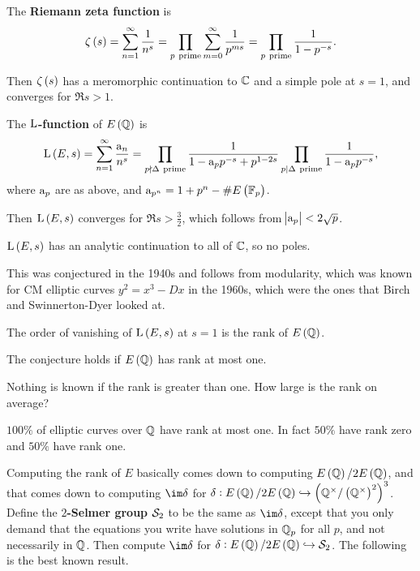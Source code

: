 \begin{definition}
The \textbf{Riemann zeta function} is
$$ \zeta\br{s} = \sum_{n = 1}^\infty \dfrac{1}{n^s} = \prod_{p \ \text{prime}} \sum_{m = 0}^\infty \dfrac{1}{p^{ms}} = \prod_{p \ \text{prime}} \dfrac{1}{1 - p^{-s}}. $$
\end{definition}

Then $ \zeta\br{s} $ has a meromorphic continuation to $ \mathbb{C} $ and a simple pole at $ s = 1 $, and converges for $ \Re s > 1 $.

\begin{definition}
The \textbf{$ \mathrm{L} $-function} of $ E\br{\QQ} $ is
$$ \L\br{E, s} = \sum_{n = 1}^\infty \dfrac{\a_n}{n^s} = \prod_{p \nmid \Delta \ \text{prime}} \dfrac{1}{1 - \a_pp^{-s} + p^{1 - 2s}}\prod_{p \mid \Delta \ \text{prime}} \dfrac{1}{1 - \a_pp^{-s}}, $$
where $ \mathrm{a}_p $ are as above, and $ \a_{p^n} = 1 + p^n - \#E\br{\FF_p} $.
\end{definition}

Then $ \L\br{E, s} $ converges for $ \Re s > \tfrac{3}{2} $, which follows from $ \abs{\mathrm{a}_p} < 2\sqrt{p} $.

\begin{theorem}
$ \L\br{E, s} $ has an analytic continuation to all of $ \mathbb{C} $, so no poles.
\end{theorem}

This was conjectured in the 1940s and follows from modularity, which was known for CM elliptic curves $ y^2 = x^3 - Dx $ in the 1960s, which were the ones that Birch and Swinnerton-Dyer looked at.

\begin{conjecture}
The order of vanishing of $ \L\br{E, s} $ at $ s = 1 $ is the rank of $ E\br{\QQ} $.
\end{conjecture}

\begin{theorem}
The conjecture holds if $ E\br{\QQ} $ has rank at most one.
\end{theorem}

Nothing is known if the rank is greater than one. How large is the rank on average?

\begin{conjecture}
$ 100\% $ of elliptic curves over $ \mathbb{Q} $ have rank at most one. In fact $ 50\% $ have rank zero and $ 50\% $ have rank one.
\end{conjecture}

Computing the rank of $ E $ basically comes down to computing $ E\br{\QQ} / 2E\br{\QQ} $, and that comes down to computing $ \im \delta $ for $ \delta : E\br{\QQ} / 2E\br{\QQ} \hookrightarrow \br{\QQ^\times / \br{\QQ^\times}^2}^3 $. Define the \textbf{$ 2 $-Selmer group} $ \mathcal{S}_2 $ to be the same as $ \im \delta $, except that you only demand that the equations you write have solutions in $ \mathbb{Q}_p $ for all $ p $, and not necessarily in $ \mathbb{Q} $. Then compute $ \im \delta $ for $ \delta : E\br{\QQ} / 2E\br{\QQ} \hookrightarrow \SSS_2 $. The following is the best known result.

